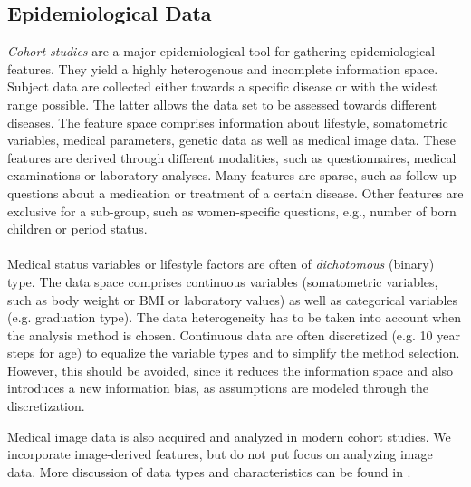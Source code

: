 \documentclass[journal]{style/vgtc} 			          %
\newcommand{\com}[1]{\textcolor{orange}{\uline{#1}}}
\begin{document}
\subsection{Epidemiological Data} \label{sec:EpidemiologicalData}
\emph{Cohort studies} are a major epidemiological tool for gathering epidemiological features.
They yield a highly heterogenous and incomplete information space.
Subject data are collected either towards a specific disease or with the widest range possible.
The latter allows the data set to be assessed towards different diseases.
The feature space comprises information about lifestyle, somatometric variables, medical parameters, genetic data as well as medical image data.
These features are derived through different modalities, such as questionnaires, medical examinations or laboratory analyses.
Many features are sparse, such as follow up questions about a medication or treatment of a certain disease.
Other features are exclusive for a sub-group, such as women-specific questions, e.g., number of born children or period status.
\\\\
Medical status variables or lifestyle factors are often of \emph{dichotomous} (binary) type.
The data space comprises continuous variables (somatometric variables, such as body weight or BMI or laboratory values) as well as categorical variables (e.g. graduation type).
The data heterogeneity has to be taken into account when the analysis method is chosen.
Continuous data are often discretized (e.g. 10 year steps for age) to equalize the variable types and to simplify the method selection.
However, this should be avoided, since it reduces the information space and also introduces a new information bias, as assumptions are modeled through the discretization.

Medical image data is also acquired and analyzed in modern cohort studies.
We incorporate image-derived features, but do not put focus on analyzing image data.
More discussion of data types and characteristics can be found in \cite{Klemm2014VIS, Toennies2015, Preim2014}.
\end{document}
